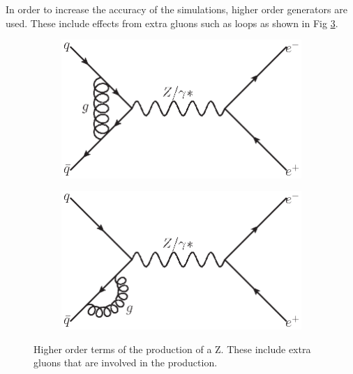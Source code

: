 In order to increase the accuracy of the simulations, higher order generators are used. These include effects from extra gluons such as loops as shown in Fig \ref{fig:HigherOrderZSim}.
\begin{figure}[!htbp]
    \centering
   \begin{subfigure}[b]{\SideBySidePlotWidth} 
        \includegraphics[width=\linewidth]{figures/DYloops.eps}
        \caption{}
        \label{fig:ZLoop1}
    \end{subfigure}%
    \begin{subfigure}[b]{\SideBySidePlotWidth}
        \includegraphics[width=\linewidth]{figures/DYmoreloops.eps}
        \caption{}
        \label{fig:ZLoop2}
    \end{subfigure}%
    \caption[
        The particles of the Standard Model.
    ]{
      Higher order terms of the production of a Z. These include extra gluons that are involved in the production.
    }
    \label{fig:HigherOrderZSim}
\end{figure}
